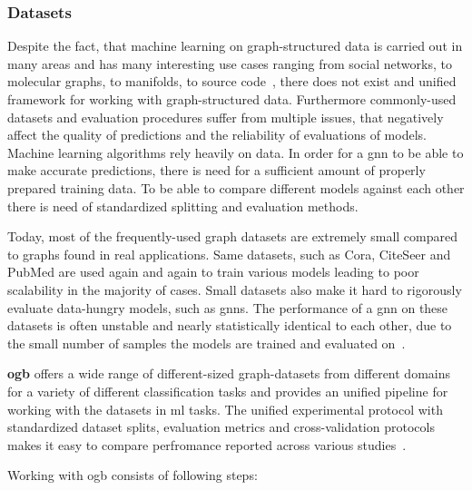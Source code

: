 \subsubsection{Datasets}
\label{sec:implement:setup:choice:data}
Despite the fact, that machine learning on graph-structured data is carried out in many areas and has many interesting use cases ranging from social networks, to molecular graphs, to manifolds, to source code~\cite{Hu2020},
there does not exist and unified framework for working with graph-structured data. Furthermore commonly-used datasets and evaluation procedures suffer from multiple issues, that negatively affect the quality of predictions and the reliability of evaluations of models.
Machine learning algorithms rely heavily on data. In order for a \ac{gnn} to be able to make accurate predictions, there is need for a sufficient amount of properly prepared training data. To be able to compare different models against each other there is need of standardized splitting and evaluation methods.

Today, most of the frequently-used
graph datasets are extremely small compared to graphs found in
real applications. Same datasets, such as Cora, CiteSeer and PubMed are used again and again to train various models leading to poor scalability in the majority of cases. Small datasets also make it hard to rigorously evaluate data-hungry models, such as \acfp{gnn}. The performance of a \ac{gnn} on these datasets is often unstable and nearly statistically identical to each other, due to the small number of samples the models are trained and evaluated on~\cite{Kipf2017,Xu2019, Hu2020}.

\textbf{\Ac{ogb}} offers a wide range of different-sized graph-datasets from different domains for a variety of different classification tasks and provides an unified pipeline for working with the datasets in \ac{ml} tasks.
The unified experimental protocol with standardized dataset splits, evaluation metrics and cross-validation protocols makes it easy to compare perfromance reported across various studies~\cite{Hu2020}.

Working with \ac{ogb} consists of following steps:

